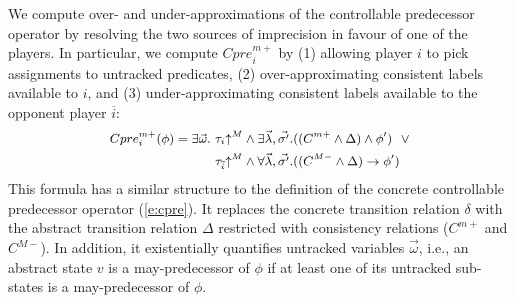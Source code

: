 \documentclass[a4paper,twoside,openright,11pt]{book}
\newcommand{\abstractM}[1]{#1\mathord{\uparrow^M}}
\newcommand{\vect}[1]{\vec{#1}}
\theoremstyle{definition}
\begin{document}
We compute over- and under-approximations of the controllable 
predecessor operator by resolving the two sources of imprecision 
in favour of one of the players.  In particular, we compute 
$Cpre_i^{m+}$ by (1) allowing player $i$ to pick assignments to 
untracked predicates, (2) over-approximating consistent labels 
available to $i$, and (3) under-approximating consistent labels 
available to the opponent player $\overline{i}$:
\begin{equation}
    \label{e:cprem}
    \small
\begin{aligned}
    Cpre_i^{m+}(\phi) = \exists \vect{\omega} .~&\abstractM{\tau_i}         \land \exists \vect{\lambda},\vect{\sigma'}. ((C^{m+} \land \Delta) \land \phi')
                                                 ~~\lor\\
                                                &\abstractM{\tau_{\overline{i}}} \land \forall \vect{\lambda},\vect{\sigma'}. ((C^{M-} \land\Delta) \rightarrow \phi')
\end{aligned}
\end{equation}
This formula has a similar structure to the definition of the 
concrete controllable predecessor operator (\ref{e:cpre}).  It 
replaces the concrete transition relation $\delta$ with the 
abstract transition relation $\Delta$ restricted with consistency 
relations ($C^{m+}$ and $C^{M-}$).  In addition, it existentially 
quantifies untracked variables $\vect{\omega}$, i.e., an abstract 
state $v$ is a may-predecessor of $\phi$ if at least one of its 
untracked sub-states is a may-predecessor of $\phi$.
\end{document}
